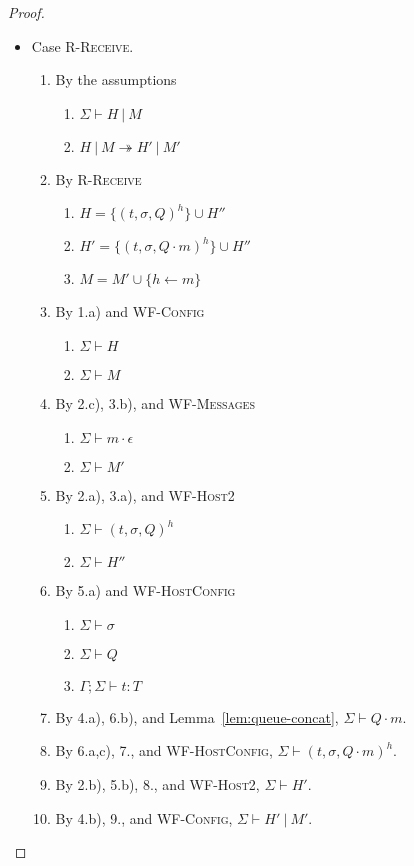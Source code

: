 \begin{proof}
\begin{itemize}
\item Case \textsc{R-Receive}.
\begin{enumerate}
\item By the assumptions
  \begin{enumerate}[label=(\alph*)]
  \item $\Sigma \vdash H~|~M$
  \item $H~|~M \twoheadrightarrow H'~|~M'$
  \end{enumerate}
\item By \textsc{R-Receive}
  \begin{enumerate}[label=(\alph*)]
  \item $H  = \{ (t, \sigma, Q)^h \} \cup H''$
  \item $H' = \{ (t, \sigma, Q \cdot m)^h \} \cup H''$
  \item $M = M' \cup \{ h \leftarrow m \}$
  \end{enumerate}
\item By 1.a) and \textsc{WF-Config}
  \begin{enumerate}[label=(\alph*)]
  \item $\Sigma \vdash H$
  \item $\Sigma \vdash M$
  \end{enumerate}
\item By 2.c), 3.b), and \textsc{WF-Messages}
  \begin{enumerate}[label=(\alph*)]
  \item $\Sigma \vdash m \cdot \epsilon$
  \item $\Sigma \vdash M'$
  \end{enumerate}
\item By 2.a), 3.a), and \textsc{WF-Host2}
  \begin{enumerate}[label=(\alph*)]
  \item $\Sigma \vdash (t, \sigma, Q)^h$
  \item $\Sigma \vdash H''$
  \end{enumerate}
\item By 5.a) and \textsc{WF-HostConfig}
  \begin{enumerate}[label=(\alph*)]
  \item $\Sigma \vdash \sigma$
  \item $\Sigma \vdash Q$
  \item $\Gamma ; \Sigma \vdash t : T$
  \end{enumerate}
\item By 4.a), 6.b), and Lemma~\ref{lem:queue-concat}, $\Sigma \vdash Q \cdot m$.
\item By 6.a,c), 7., and \textsc{WF-HostConfig}, $\Sigma \vdash (t, \sigma, Q \cdot m)^h$.
\item By 2.b), 5.b), 8., and \textsc{WF-Host2}, $\Sigma \vdash H'$.
\item By 4.b), 9., and \textsc{WF-Config}, $\Sigma \vdash H'~|~M'$.
\end{enumerate}


\end{itemize}
\end{proof}
